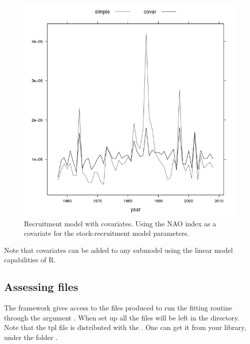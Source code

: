 \documentclass[a4paper,english,10pt]{article}\usepackage[]{graphicx}\usepackage[]{color}
\newenvironment{knitrout}{}{} %
\begin{document}
\begin{knitrout}
\color{fgcolor}\begin{figure}[H]

{\centering \includegraphics[width=.9\linewidth]{figure/naor2-1} 

}

\caption[Recruitment model with covariates]{Recruitment model with covariates. Using the NAO index as a covariate for the stock-recruitment model parameters.}\label{fig:naor2}
\end{figure}


\end{knitrout}

Note that covariates can be added to any submodel using the linear model capabilities of R.

\subsection{Assessing  files}

The framework gives access to the files produced to run the  fitting routine through the argument . When set up all the  files will be left in the directory. Note that the  tpl file is distributed with the . One can get it from your  library, under the folder .
\end{document}
